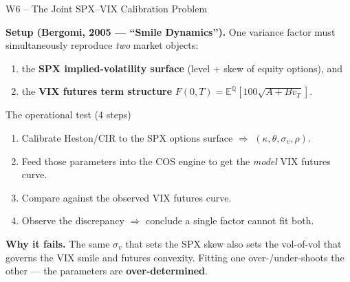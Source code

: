 \documentclass[aspectratio=169, 11pt]{beamer}
\begin{document}
\begin{frame}{W6 -- The Joint SPX--VIX Calibration Problem}

\textbf{Setup (Bergomi, 2005 --- ``Smile Dynamics'').}\; One variance factor must
simultaneously reproduce \textit{two} market objects:

\medskip
\begin{enumerate}
  \item the \textbf{SPX implied-volatility surface} (level + skew of equity options), and
  \item the \textbf{VIX futures term structure} $F(0,T) = \mathbb{E}^{\mathbb{Q}}[100\sqrt{A + B v_T}]$.
\end{enumerate}

\vspace{4pt}
\begin{block}{The operational test (4 steps)}
\small
\begin{enumerate}
  \item Calibrate Heston/CIR to the SPX options surface $\Rightarrow$ $(\kappa,\theta,\sigma_v,\rho)$.
  \item Feed those parameters into the COS engine to get the \textit{model} VIX futures curve.
  \item Compare against the observed VIX futures curve.
  \item Observe the discrepancy $\Rightarrow$ conclude a single factor cannot fit both.
\end{enumerate}
\end{block}

\vspace{2pt}
\textbf{Why it fails.}\; The same $\sigma_v$ that sets the SPX skew also sets the
vol-of-vol that governs the VIX smile and futures convexity. Fitting one over-/under-shoots
the other --- the parameters are \textbf{over-determined}.
\end{frame}
\end{document}
